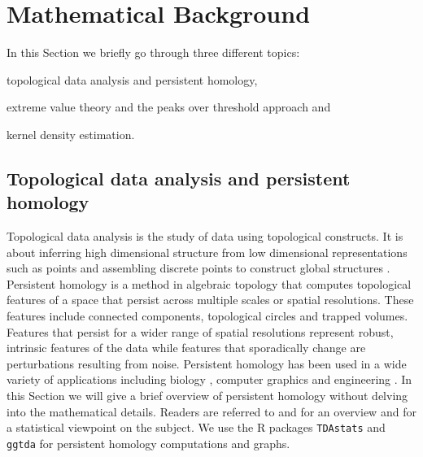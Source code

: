 \documentclass[letter,12pt]{article}
\begin{document}
\section{Mathematical Background}\label{sec:methodology}
In this Section we briefly go through three different topics: \begin{inparaenum} \item topological data analysis and persistent homology, \item extreme value theory and the peaks over threshold approach and \item kernel density estimation. \end{inparaenum}  

\subsection{Topological data analysis and persistent homology}\label{subsec:tda}
Topological data analysis is the study of data using topological constructs. It is about inferring high dimensional structure from low dimensional representations such as points and assembling discrete points to construct global structures \citep{ghrist2008barcodes}. Persistent homology is a method in algebraic topology that computes topological features of a space that persist across multiple scales or spatial resolutions. These features include connected components, topological circles and trapped volumes.  Features that persist for a wider range of spatial resolutions represent robust, intrinsic features of the data while features that sporadically change are perturbations resulting from noise. Persistent homology has been used in a wide variety of applications including biology  \citep{topaz2015topological}, computer graphics \citep{carlsson2008local} and engineering \citep{perea2015sliding}. In this Section we will give a brief overview of persistent homology without delving into the mathematical details. Readers are referred to \cite{ghrist2008barcodes} and \cite{Carlsson2009} for an overview and \cite{wasserman2018topological} for a statistical viewpoint on the subject. We use the R packages \texttt{TDAstats} and \texttt{ggtda} for persistent homology computations and graphs.
\end{document}
